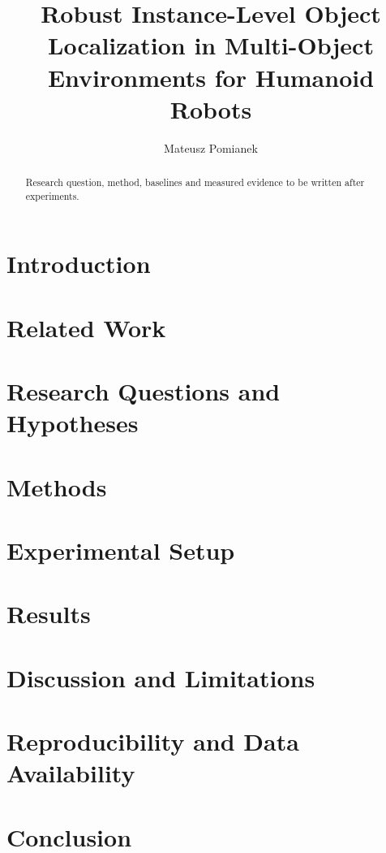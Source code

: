 \documentclass[11pt,a4paper]{article}
\title{Robust Instance-Level Object Localization in Multi-Object Environments for Humanoid Robots}
\author{Mateusz Pomianek}
\date{}
\begin{document}
\maketitle
\begin{abstract}
Research question, method, baselines and measured evidence to be written after experiments.
\end{abstract}
\section{Introduction}
\section{Related Work}
\section{Research Questions and Hypotheses}
\section{Methods}
\section{Experimental Setup}
\section{Results}
\section{Discussion and Limitations}
\section{Reproducibility and Data Availability}
\section{Conclusion}
\end{document}

